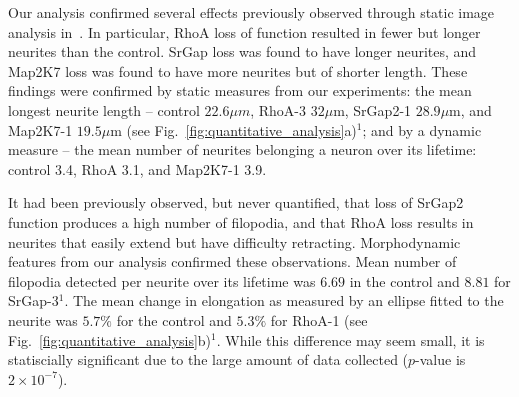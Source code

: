 





Our analysis confirmed several effects previously observed through static image
analysis  in~\cite{Pertz08}.  In  particular,  RhoA  loss  of  function
resulted in fewer but longer neurites than the control. SrGap loss was
found to have longer neurites, and  Map2K7 loss was found to have
more neurites but of shorter length.  These findings  were confirmed by 
static measures from
our experiments: the mean longest  neurite length -- control $22.6 \mu
m$, RhoA-3 $32  \mu$m, SrGap2-1 $28.9 \mu$m,  and Map2K7-1 $19.5 \mu$m  
(see  Fig.~\ref{fig:quantitative_analysis}a)$^1$;  and  by  a  dynamic
measure --  the mean  number of neurites  belonging a neuron  over its
lifetime: control 3.4, RhoA 3.1, and Map2K7-1 3.9.

It  had been previously observed, but  never quantified,  that  loss of
SrGap2 function  produces a  high number of  filopodia, and  that RhoA
loss  results  in neurites  that  easily  extend  but have  difficulty
retracting. Morphodynamic features from our analysis confirmed these
observations. Mean number of filopodia detected per  neurite over its lifetime was $6.69$
in the control  and $8.81$ for SrGap-3$^1$. The  mean change in elongation
as measured  by an ellipse fitted  to the neurite was  $5.7\%$ for the
control        and        $5.3\%$        for        RhoA-1        (see
Fig.~\ref{fig:quantitative_analysis}b)$^1$. While this difference may seem
small,  it is  statiscially significant due  to the  large amount  of  data collected
($p$-value is $2 \times 10^{-7}$).


